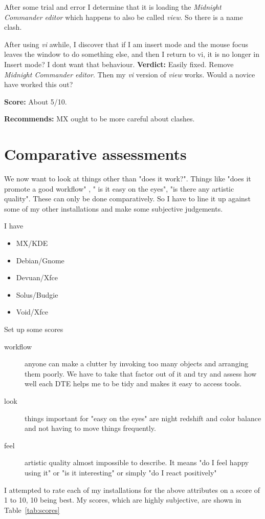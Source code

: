 \documentclass{article}  %
\begin{document}
After some trial and error I determine that it is loading the {\em Midnight Commander editor} which happens to also be called {\em view}. So there is a name clash.

After using {\em vi} awhile, I discover that if I am insert mode and the mouse focus leaves the window to do something else, and then I return to vi, it is no longer in Insert mode? I dont want that behaviour. 
{\bf Verdict:} Easily fixed. Remove {\em Midnight Commander editor}. Then my {\em vi} version of {\em view} works. Would a novice have worked this out?

{\bf Score:} About 5/10. 

{\bf Recommends:} MX ought to be more careful about clashes.

\section{Comparative assessments}
We now want to look at things other than "does it work?". Things like "does it promote a good workflow" , " is it easy on the eyes", "is there any artistic quality". These can only be done comparatively. So I have to line it up against some of my other installations and make some subjective judgements.

I have
\begin{itemize}
\item MX/KDE
\item Debian/Gnome
\item Devuan/Xfce
\item Solus/Budgie
\item Void/Xfce
\end{itemize}
Set up some scores
\begin{description}
\item[workflow] anyone can make a clutter by invoking too many objects and arranging them poorly. We have to take that factor out of it  and try and assess how well each DTE helps me to be tidy and makes it easy to access tools. 
\item[look] things important for "easy on the eyes" are night redshift and color balance and not having to move things frequently.
\item[feel] artistic quality almost impossible to describe. It means "do I feel happy using it" or "is it interesting" or simply "do I react positively"
\end{description}
 I attempted to rate each of my installations for the above attributes on a score of 1 to 10, 10 being best. My scores, which are highly subjective, are shown in Table~\ref{tab:scores}

\end{document}
